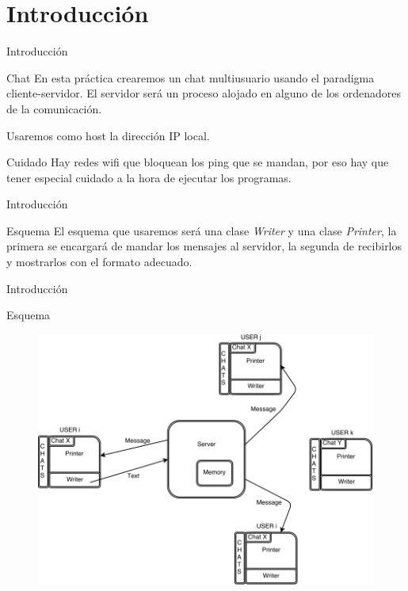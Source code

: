 \section{Introducción}
\begin{frame}{Introducción}
	\begin{block}{Chat}
		En esta práctica crearemos un chat multiusuario usando el paradigma cliente-servidor. El servidor será
		un proceso alojado en alguno de los ordenadores de la comunicación. 
		
		Usaremos como host la dirección IP local.
	\end{block}
	\begin{alertblock}{Cuidado}
		Hay redes wifi que bloquean los ping que se mandan, por eso
		hay que tener especial cuidado a la hora de ejecutar los programas.
	\end{alertblock}
\end{frame}




\begin{frame}{Introducción}
	\begin{block}{Esquema}
		El esquema que usaremos será una clase \textit{Writer} y una clase \textit{Printer}, la primera se encargará de mandar los mensajes al servidor, la segunda de recibirlos y mostrarlos con el formato adecuado.
	\end{block}
\end{frame}




\begin{frame}{Introducción}
	\begin{exampleblock}{Esquema}
		\begin{figure}[H]
    		\includegraphics[scale=0.31]{./Imagenes/chat.png}
		\end{figure}
	\end{exampleblock}
\end{frame}